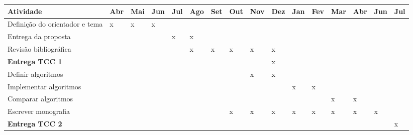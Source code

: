 \begin{table}[h!]
    \begin{tabularx}{\textwidth}{|l|X|X|X|X|X|X|X|X|X|X|X|X|X|X|X|}
        \hline
        \textbf{Atividade} & Abr & Mai & Jun & Jul & Ago & Set & Out & Nov & Dez & Jan & Fev & Mar & Abr & Jun & Jul \\
        \hline
        \multicolumn{1}{|p{4em}|}{Definição do orientador e tema} & x & x & x &&&&&&&&&&&&\\
        \hline
        \multicolumn{1}{|p{4em}|}{Entrega da proposta} &&&& x & x &&&&&&&&&& \\
        \hline
        \multicolumn{1}{|p{4em}|}{Revisão bibliográfica} &&&&& x & x & x & x & x &&&&&& \\
        \hline
        \multicolumn{1}{|p{4em}|}{\textbf{Entrega TCC 1}} &&&&&&&&& x &&&&&& \\
        \hline
        \multicolumn{1}{|p{4em}|}{Definir algoritmos} &&&&&&&& x & x &&&&&& \\
        \hline
        \multicolumn{1}{|p{4em}|}{Implementar algoritmos} &&&&&&&&&& x & x &&&& \\
        \hline
        \multicolumn{1}{|p{4em}|}{Comparar algoritmos} &&&&&&&&&&&& x & x && \\
        \hline
        \multicolumn{1}{|p{4em}|}{Escrever monografia} &&&&&&& x & x & x & x & x & x & x & x & \\
        \hline
        \multicolumn{1}{|p{4em}|}{\textbf{Entrega TCC 2}} &&&&&&&&&&&&&&& x \\
        \hline
    \end{tabularx}
    \label{tab:timeline}
\end{table}